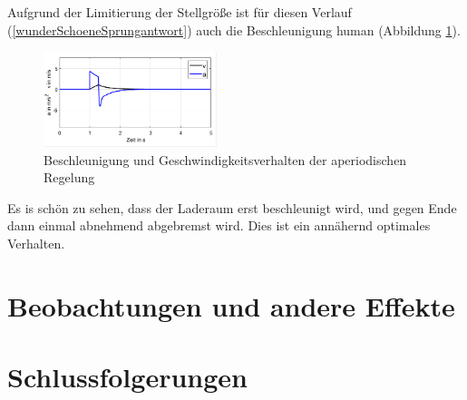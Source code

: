 	Aufgrund der Limitierung der Stellgröße ist für diesen Verlauf (\ref{wunderSchoeneSprungantwort}) auch die Beschleunigung
	human (Abbildung \ref{beschleunigungHuman}).

	\begin{figure}[h] 
		\centering
			\includegraphics[width=0.45\textwidth]{Bilder/beschleunigungUndGeschwindigkeit.png}
		\caption{Beschleunigung und Geschwindigkeitsverhalten der aperiodischen Regelung}
		\label{beschleunigungHuman}
	\end{figure}

	Es is schön zu sehen, dass der Laderaum erst beschleunigt wird, und gegen Ende dann einmal abnehmend abgebremst wird.
	Dies ist ein annähernd optimales Verhalten.

	





\section{Beobachtungen und andere Effekte}

\section{Schlussfolgerungen}


